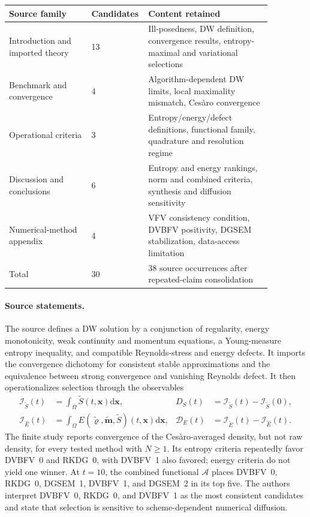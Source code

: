 \begin{center}
\begin{tabular}{p{0.30\linewidth}p{0.12\linewidth}p{0.45\linewidth}}
\hline
Source family & Candidates & Content retained \\
\hline
Introduction and imported theory & 13 & Ill-posedness, DW definition, convergence results, entropy-maximal and variational selections \\
Benchmark and convergence & 4 & Algorithm-dependent DW limits, local maximality mismatch, Ces\`aro convergence \\
Operational criteria & 3 & Entropy/energy/defect definitions, functional family, quadrature and resolution regime \\
Discussion and conclusions & 6 & Entropy and energy rankings, norm and combined criteria, synthesis and diffusion sensitivity \\
Numerical-method appendix & 4 & VFV consistency condition, DVBFV positivity, DGSEM stabilization, data-access limitation \\
\hline
Total & 30 & 38 source occurrences after repeated-claim consolidation \\
\hline
\end{tabular}
\end{center}

\paragraph{Source statements.}
The source defines a DW solution by a conjunction of regularity, energy monotonicity, weak continuity and momentum equations, a Young-measure entropy inequality, and compatible Reynolds-stress and energy defects. It imports the convergence dichotomy for consistent stable approximations and the equivalence between strong convergence and vanishing Reynolds defect. It then operationalizes selection through the observables
\begin{align}
\mathcal I_{\widetilde S}(t) &= \int_\Omega \widetilde S(t,\mathbf x) \mathrm d\mathbf x, &
D_S(t) &= \mathcal I_{\widetilde S}(t)-\mathcal I_{\widetilde S}(0),\\
\mathcal I_{\widehat E}(t) &= \int_\Omega E(\widetilde\varrho,\widetilde{\mathbf m},\widetilde S)(t,\mathbf x) \mathrm d\mathbf x, &
\mathcal D_E(t) &= \mathcal I_{\widetilde E}(t)-\mathcal I_{\widehat E}(t).
\end{align}
The finite study reports convergence of the Ces\`aro-averaged density, but not raw density, for every tested method with $N\geq 1$. Its entropy criteria repeatedly favor DVBFV~0 and RKDG~0, with DVBFV~1 also favored; energy criteria do not yield one winner. At $t=10$, the combined functional $\mathcal A$ places DVBFV~0, RKDG~0, DGSEM~1, DVBFV~1, and DGSEM~2 in its top five. The authors interpret DVBFV~0, RKDG~0, and DVBFV~1 as the most consistent candidates and state that selection is sensitive to scheme-dependent numerical diffusion.

